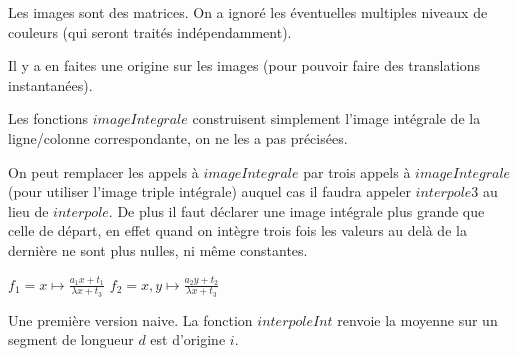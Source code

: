 


Les images sont des matrices. On a ignoré les éventuelles multiples niveaux de couleurs (qui seront traités indépendamment).

Il y a en faites une origine sur les images (pour pouvoir faire des translations instantanées).

\medbreak
Les fonctions $imageIntegrale$ construisent simplement l'image intégrale de la ligne/colonne correspondante, on ne les a pas précisées.

On peut remplacer les appels à $imageIntegrale$ par trois appels à $imageIntegrale$ (pour utiliser l'image triple intégrale) auquel cas il faudra appeler $interpole3$ au lieu de $interpole$. De plus il faut déclarer une image intégrale plus grande que celle de départ, en effet quand on intègre trois fois les valeurs au delà de la dernière ne sont plus nulles, ni même constantes.


\begin{algorithm}[H]
\caption{$applyHomography(img,imgf,H)$}
$f_1 = x\mapsto \frac{a_1x + t_1}{\lambda x + t_3}$ \;
$f_2 = x,y\mapsto \frac{a_2y + t_2}{\lambda x + t_3}$ \;
\end{algorithm}


Une première version naive. La fonction $interpoleInt$ renvoie la moyenne sur un segment de longueur $d$ est d'origine $i$.

